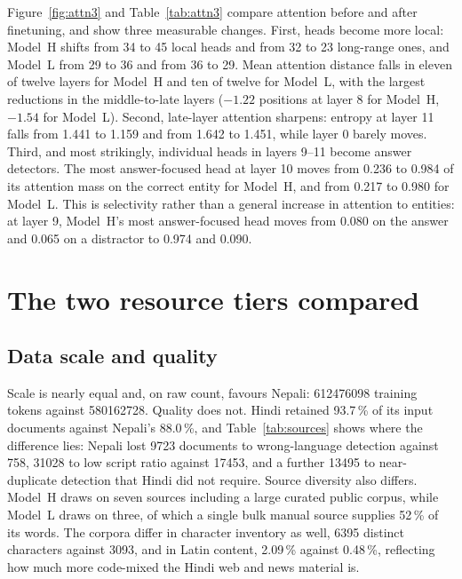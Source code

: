 \documentclass[10pt,a4paper]{article}
\newcommand{\pc}[1]{#1\,\%}
\begin{document}
Figure~\ref{fig:attn3} and Table~\ref{tab:attn3} compare attention before and
after finetuning, and show three measurable changes. First, heads become more
local: Model~H shifts from \num{34} to \num{45} local heads and from \num{32} to
\num{23} long-range ones, and Model~L from \num{29} to \num{36} and from \num{36}
to \num{29}. Mean attention distance falls in eleven of twelve layers for
Model~H and ten of twelve for Model~L, with the largest reductions in the
middle-to-late layers ($-1.22$ positions at layer 8 for Model~H, $-1.54$ for
Model~L). Second, late-layer attention sharpens: entropy at layer 11 falls from
1.441 to 1.159 and from 1.642 to 1.451, while layer 0 barely moves. Third, and
most strikingly, individual heads in layers 9--11 become answer detectors. The
most answer-focused head at layer 10 moves from 0.236 to 0.984 of its attention
mass on the correct entity for Model~H, and from 0.217 to 0.980 for Model~L.
This is selectivity rather than a general increase in attention to entities: at
layer 9, Model~H's most answer-focused head moves from 0.080 on the answer and
0.065 on a distractor to 0.974 and 0.090.

\section{The two resource tiers compared}\label{sec:tiers}

\subsection{Data scale and quality}

Scale is nearly equal and, on raw count, favours Nepali: \num{612476098} training
tokens against \num{580162728}. Quality does not. Hindi retained \pc{93.7} of its
input documents against Nepali's \pc{88.0}, and Table~\ref{tab:sources} shows
where the difference lies: Nepali lost \num{9723} documents to wrong-language
detection against \num{758}, \num{31028} to low script ratio against
\num{17453}, and a further \num{13495} to near-duplicate detection that Hindi did
not require. Source diversity also differs. Model~H draws on seven sources
including a large curated public corpus, while Model~L draws on three, of which a
single bulk manual source supplies \pc{52} of its words. The corpora differ in
character inventory as well, \num{6395} distinct characters against \num{3093},
and in Latin content, \pc{2.09} against \pc{0.48}, reflecting how much more
code-mixed the Hindi web and news material is.
\end{document}
